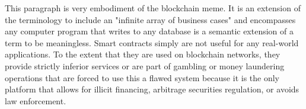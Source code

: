 This paragraph is very embodiment of the blockchain meme. It is an extension of
the terminology to include an "infinite array of business cases" and encompasses
any computer program that writes to any database is a semantic extension of a
term to be meaningless. Smart contracts simply are not useful for any real-world
applications. To the extent that they are used on blockchain networks, they
provide strictly inferior services or are part of gambling or money laundering
operations that are forced to use this a flawed system because it is the only
platform that allows for illicit financing, arbitrage securities regulation, or
avoids law enforcement.
